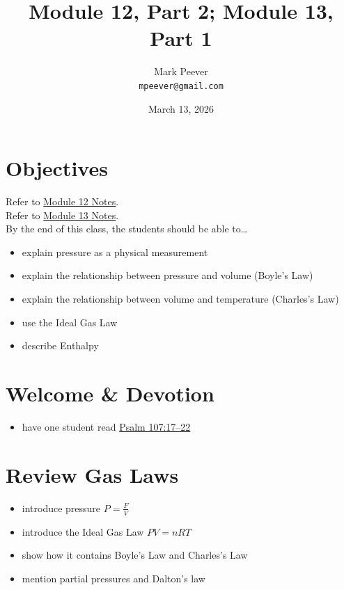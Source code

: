 \documentclass[10pt, oneside]{article}   	%
\title{Module 12, Part 2; Module 13, Part 1}
\author{Mark Peever\\ \texttt{mpeever@gmail.com}}
\date{March 13, 2026}
\begin{document}
\maketitle

\section*{Objectives}
Refer to \href{https://drive.google.com/file/d/1JpZKagO_RQ2Az20Uw2yLxLpzfNrq7TlN/view?usp=sharing}{Module 12 Notes}.\\
Refer to \href{https://drive.google.com/file/d/1fjlyN9yBxzAyjC-e-0vPJIUG56TnYqO6/view?usp=sharing}{Module 13 Notes}.\\

By the end of this class, the students should be able to\ldots
\begin{itemize}
\item explain pressure as a physical measurement
\item explain the relationship between pressure and volume (Boyle's Law)
\item explain the relationship between volume and temperature (Charles's Law)
\item use the Ideal Gas Law
\item describe Enthalpy
\end{itemize}

\section*{Welcome \& Devotion}
\begin{itemize}
\item have one student read \href{https://www.biblegateway.com/passage/?search=psalm\%20107\&version=LSB}{Psalm 107:17--22}
\end{itemize}

\section*{Review Gas Laws}

\begin{itemize}
\item introduce pressure $P = \frac{F}{V}$
\item introduce the Ideal Gas Law $P V = n R T$
\item show how it contains Boyle's Law and Charles's Law
\item mention partial pressures and Dalton's law
\end{itemize}
\end{document}

